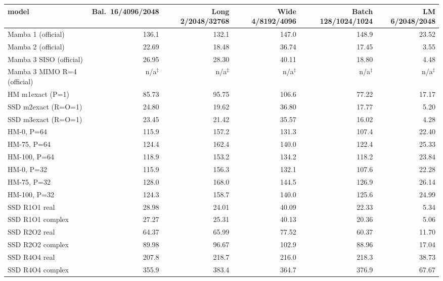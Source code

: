 \begin{tabular}{l r r r r r }
\toprule
model & Bal.\ 16/4096/2048 & Long 2/2048/32768 & Wide 4/8192/4096 & Batch 128/1024/1024 & LM 6/2048/2048 \\
\midrule
Mamba 1 (official) & 136.1 & 132.1 & 147.0 & 148.9 & 23.52 \\
Mamba 2 (official) & 22.69 & 18.48 & 36.74 & 17.45 & 3.55 \\
Mamba 3 SISO (official) & 26.95 & 28.30 & 40.11 & 18.80 & 4.48 \\
Mamba 3 MIMO R=4 (official) & n/a$^\ddagger$ & n/a$^\ddagger$ & n/a$^\ddagger$ & n/a$^\ddagger$ & n/a$^\ddagger$ \\
HM m1exact (P=1) & 85.73 & 95.75 & 106.6 & 77.22 & 17.17 \\
SSD m2exact (R=O=1) & 24.80 & 19.62 & 36.80 & 17.77 & 5.20 \\
SSD m3exact (R=O=1) & 23.45 & 21.42 & 35.57 & 16.02 & 4.28 \\
HM-0, P=64 & 115.9 & 157.2 & 131.3 & 107.4 & 22.40 \\
HM-75, P=64 & 124.4 & 162.4 & 140.0 & 122.4 & 25.33 \\
HM-100, P=64 & 118.9 & 153.2 & 134.2 & 118.2 & 23.84 \\
HM-0, P=32 & 115.9 & 156.3 & 132.1 & 107.6 & 22.28 \\
HM-75, P=32 & 128.0 & 168.0 & 144.5 & 126.9 & 26.14 \\
HM-100, P=32 & 124.3 & 158.7 & 140.0 & 125.6 & 24.99 \\
SSD R1O1 real & 28.98 & 24.01 & 40.09 & 22.33 & 5.34 \\
SSD R1O1 complex & 27.27 & 25.31 & 40.13 & 20.36 & 5.06 \\
SSD R2O2 real & 64.37 & 65.99 & 77.52 & 60.37 & 11.70 \\
SSD R2O2 complex & 89.98 & 96.67 & 102.9 & 88.96 & 17.04 \\
SSD R4O4 real & 207.8 & 218.7 & 216.0 & 218.3 & 38.73 \\
SSD R4O4 complex & 355.9 & 383.4 & 364.7 & 376.9 & 67.67 \\
\bottomrule
\end{tabular}
